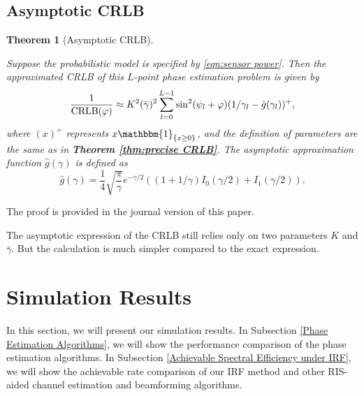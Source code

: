 \documentclass[conference,10pt,twocolumn]{IEEEtran}
\newtheorem{theorem}{\bf Theorem}
\theoremstyle{nonumberplain}
\begin{document}
\subsection{Asymptotic CRLB}    \label{Asymptotic CRLB}
    \begin{theorem}[Asymptotic CRLB] \label{thm:asymptotic CRLB} \mbox{}\par
        Suppose the probabilistic model is specified by \eqref{eqn:sensor power}. Then the approximated CRLB of this $L$-point phase estimation problem is given by 
        \begin{equation}
            \frac{1}{{\rm CRLB}(\varphi)}\approx K^2(\bar{\gamma})^2 \sum_{l=0}^{L-1}\sin^2(\psi_l+\varphi)(1/\gamma_l-\hat{g}(\gamma_l))^{+},
            \label{eqn:asymptotic CRLB}
        \end{equation}
        where $(x)^{+}$ represents ${x{\mathbbm{1}}_{\{x\geq 0\}}}$, and the definition of parameters are the same as in {\bf Theorem \ref{thm:precise CRLB}}. The asymptotic approximation function $\hat{g}(\gamma)$ is defined as 
        \begin{equation}
            \hat{g}(\gamma) = \frac{1}{4} \sqrt{\frac{\pi}{\gamma}}e^{-\gamma/2}\left((1+1/\gamma)I_0(\gamma/2) + I_1(\gamma/2)\right).
            \label{eqn:definition g function}
        \end{equation}
    \end{theorem}
    \begin{IEEEproof}
        The proof is provided in the journal version of this paper. 
    \end{IEEEproof}
    
    The asymptotic expression of the CRLB still relies only on two parameters $K$ and $\bar{\gamma}$. But the calculation is much simpler compared to the exact expression. 


\section{Simulation Results}
\label{Simulation Results}
In this section, we will present our simulation results. In Subsection \ref{Phase Estimation Algorithms}, we will show the performance comparison of the phase estimation algorithms. In Subsection \ref{Achievable Spectral Efficiency under IRF}, we will show the achievable rate comparison of our \ac{IRF} method and other RIS-aided channel estimation and beamforming algorithms. 
\end{document}
